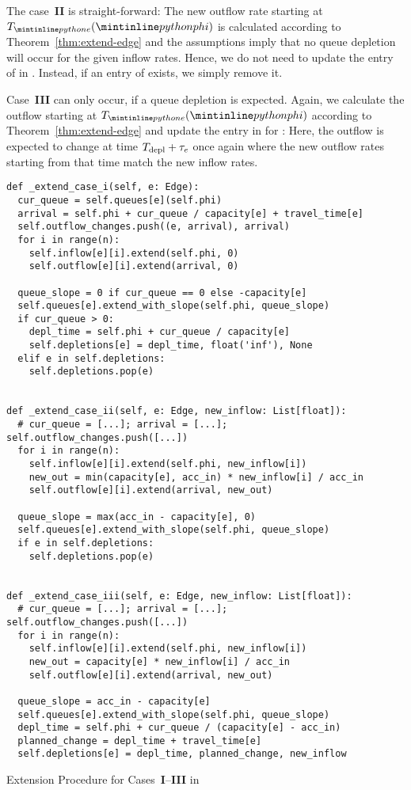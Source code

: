 The case~\textbf{II} is straight-forward:
The new outflow rate starting at $T_{\code{e}}(\code{phi})$ is calculated according to Theorem~\ref{thm:extend-edge} and the assumptions imply that no queue depletion will occur for the given inflow rates.
Hence, we do not need to update the entry of  in .
Instead, if an entry of  exists, we simply remove it.

Case~\textbf{III} can only occur, if a queue depletion is expected.
Again, we calculate the outflow starting at $T_{\code{e}}(\code{phi})$ according to Theorem~\ref{thm:extend-edge} and update the entry in  for :
Here, the outflow is expected to change at time $T_{\textnormal{depl}} + \tau_e$ once again where the new outflow rates starting from that time match the new inflow rates. 


\begin{algorithm}
    \begin{verbatim}
def _extend_case_i(self, e: Edge):
  cur_queue = self.queues[e](self.phi)
  arrival = self.phi + cur_queue / capacity[e] + travel_time[e]
  self.outflow_changes.push((e, arrival), arrival)
  for i in range(n):
    self.inflow[e][i].extend(self.phi, 0)
    self.outflow[e][i].extend(arrival, 0)

  queue_slope = 0 if cur_queue == 0 else -capacity[e]
  self.queues[e].extend_with_slope(self.phi, queue_slope)
  if cur_queue > 0:
    depl_time = self.phi + cur_queue / capacity[e]
    self.depletions[e] = depl_time, float('inf'), None
  elif e in self.depletions:
    self.depletions.pop(e)


def _extend_case_ii(self, e: Edge, new_inflow: List[float]):
  # cur_queue = [...]; arrival = [...]; self.outflow_changes.push([...])
  for i in range(n):
    self.inflow[e][i].extend(self.phi, new_inflow[i])
    new_out = min(capacity[e], acc_in) * new_inflow[i] / acc_in
    self.outflow[e][i].extend(arrival, new_out)

  queue_slope = max(acc_in - capacity[e], 0)
  self.queues[e].extend_with_slope(self.phi, queue_slope)
  if e in self.depletions:
    self.depletions.pop(e)


def _extend_case_iii(self, e: Edge, new_inflow: List[float]):
  # cur_queue = [...]; arrival = [...]; self.outflow_changes.push([...])
  for i in range(n):
    self.inflow[e][i].extend(self.phi, new_inflow[i])
    new_out = capacity[e] * new_inflow[i] / acc_in
    self.outflow[e][i].extend(arrival, new_out)

  queue_slope = acc_in - capacity[e]
  self.queues[e].extend_with_slope(self.phi, queue_slope)
  depl_time = self.phi + cur_queue / (capacity[e] - acc_in)
  planned_change = depl_time + travel_time[e]
  self.depletions[e] = depl_time, planned_change, new_inflow
\end{verbatim}
\caption{Extension Procedure for Cases~\textbf{I}--\textbf{III} in }
\label{alg:extend-cases}
\end{algorithm}

